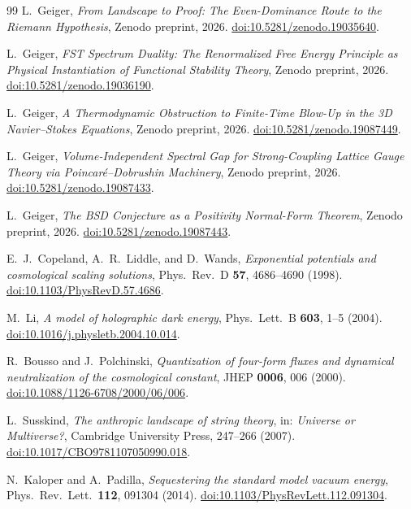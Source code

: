\documentclass[12pt,a4paper]{article}
\theoremstyle{definition}
\theoremstyle{plain}
\theoremstyle{remark}
\begin{document}
\begin{thebibliography}{99}
L.~Geiger, \textit{From Landscape to Proof: The Even-Dominance Route to the Riemann Hypothesis}, Zenodo preprint, 2026.
\href{https://doi.org/10.5281/zenodo.19035640}{doi:10.5281/zenodo.19035640}.

L.~Geiger, \textit{FST Spectrum Duality: The Renormalized Free Energy Principle as Physical Instantiation of Functional Stability Theory}, Zenodo preprint, 2026.
\href{https://doi.org/10.5281/zenodo.19036190}{doi:10.5281/zenodo.19036190}.

L.~Geiger, \textit{A Thermodynamic Obstruction to Finite-Time Blow-Up in the 3D Navier--Stokes Equations},
Zenodo preprint, 2026.
\href{https://doi.org/10.5281/zenodo.19087449}{doi:10.5281/zenodo.19087449}.

L.~Geiger, \textit{Volume-Independent Spectral Gap for Strong-Coupling Lattice Gauge Theory via Poincaré--Dobrushin Machinery},
Zenodo preprint, 2026.
\href{https://doi.org/10.5281/zenodo.19087433}{doi:10.5281/zenodo.19087433}.

L.~Geiger, \textit{The BSD Conjecture as a Positivity Normal-Form Theorem},
Zenodo preprint, 2026.
\href{https://doi.org/10.5281/zenodo.19087443}{doi:10.5281/zenodo.19087443}.

E.~J.~Copeland, A.~R.~Liddle, and D.~Wands,
\textit{Exponential potentials and cosmological scaling solutions},
Phys.\ Rev.\ D \textbf{57}, 4686--4690 (1998).
\href{https://doi.org/10.1103/PhysRevD.57.4686}{doi:10.1103/PhysRevD.57.4686}.

M.~Li,
\textit{A model of holographic dark energy},
Phys.\ Lett.\ B \textbf{603}, 1--5 (2004).
\href{https://doi.org/10.1016/j.physletb.2004.10.014}{doi:10.1016/j.physletb.2004.10.014}.

R.~Bousso and J.~Polchinski,
\textit{Quantization of four-form fluxes and dynamical neutralization of the cosmological constant},
JHEP \textbf{0006}, 006 (2000).
\href{https://doi.org/10.1088/1126-6708/2000/06/006}{doi:10.1088/1126-6708/2000/06/006}.

L.~Susskind,
\textit{The anthropic landscape of string theory},
in: \textit{Universe or Multiverse?}, Cambridge University Press, 247--266 (2007).
\href{https://doi.org/10.1017/CBO9781107050990.018}{doi:10.1017/CBO9781107050990.018}.

N.~Kaloper and A.~Padilla,
\textit{Sequestering the standard model vacuum energy},
Phys.\ Rev.\ Lett.\ \textbf{112}, 091304 (2014).
\href{https://doi.org/10.1103/PhysRevLett.112.091304}{doi:10.1103/PhysRevLett.112.091304}.


\end{thebibliography}
\end{document}
